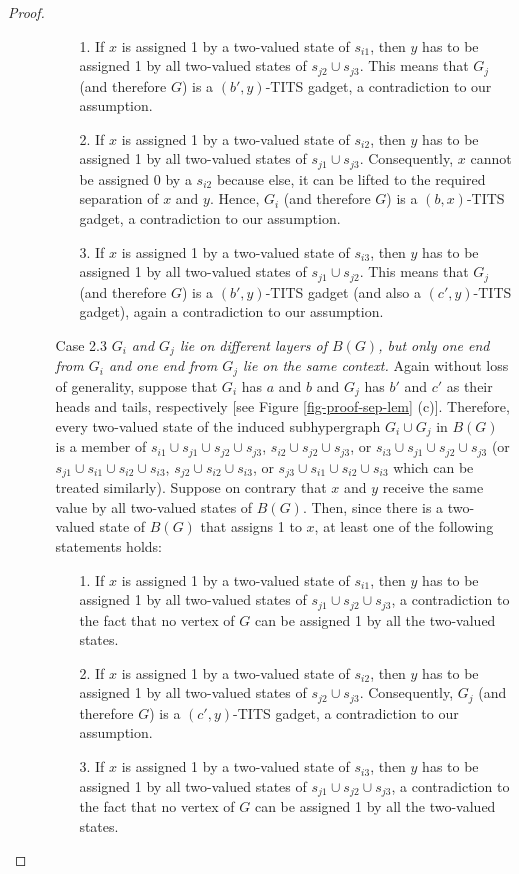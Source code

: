 \documentclass[%
12pt,
prereprint,
showpacs,
showkeys,
preprintnumbers,
amsmath,amssymb,
aps,
pra,
longbibliography,
notitlepage
]{revtex4-1}
\theoremstyle{definition}
\begin{document}
\begin{proof}
\begin{itemize}
\begin{itemize}
				\begin{itemize}
					\item[1.] If $x$ is assigned 1 by a two-valued state of $s_{i1}$, then $y$ has to be assigned 1 by all two-valued states of $s_{j2}\cup s_{j3}$. This means that $G_j$ (and therefore $G$) is a $(b',y)$-TITS gadget, a contradiction to our assumption.
					\item[2.] If $x$ is assigned 1 by a two-valued state of $s_{i2}$, then $y$ has to be assigned 1 by all two-valued states of $s_{j1}\cup s_{j3}$. Consequently, $x$ cannot be assigned 0 by a $s_{i2}$ because else, it can be lifted to the required separation of $x$ and $y$. Hence, $G_i$ (and therefore $G$) is a $(b,x)$-TITS gadget, a contradiction to our assumption.
					\item[3.] If $x$ is assigned 1 by a two-valued state of $s_{i3}$, then $y$ has to be assigned 1 by all two-valued states of $s_{j1}\cup s_{j2}$. This means that $G_j$ (and therefore $G$) is a $(b',y)$-TITS gadget (and also a $(c',y)$-TITS gadget), again a contradiction to our assumption.
				\end{itemize}
				\item[Case 2.3] \emph{$G_i$ and $G_j$ lie on different layers of $B(G)$, but only one end from $G_i$ and one end from $G_j$ lie on the same context.} Again without loss of generality, suppose that $G_i$ has $a$ and $b$ and $G_j$ has $b'$ and $c'$ as their heads and tails, respectively [see Figure \ref{fig-proof-sep-lem} (c)]. Therefore, every two-valued state of the induced subhypergraph $G_i \cup G_j$ in $B(G)$ is a member of $s_{i1} \cup s_{j1}\cup s_{j2}\cup s_{j3}$, $s_{i2} \cup s_{j2}\cup s_{j3}$, or $s_{i3}\cup s_{j1}\cup s_{j2} \cup s_{j3}$ (or $s_{j1} \cup s_{i1}\cup s_{i2}\cup s_{i3}$, $s_{j2} \cup s_{i2}\cup s_{i3}$, or $s_{j3}\cup s_{i1}\cup s_{i2} \cup s_{i3}$ which can be treated similarly). Suppose on contrary that $x$ and $y$ receive the same value by all two-valued states of $B(G)$. Then, since there is a two-valued state of $B(G)$ that assigns 1 to $x$, at least one of the following statements holds:
				
				\begin{itemize}
					\item[1.] If $x$ is assigned 1 by a two-valued state of $s_{i1}$, then $y$ has to be assigned 1 by all two-valued states of $s_{j1}\cup s_{j2}\cup s_{j3}$, a contradiction to the fact that no vertex of $G$ can be assigned 1 by all the two-valued states.
					\item[2.] If $x$ is assigned 1 by a two-valued state of $s_{i2}$, then $y$ has to be assigned 1 by all two-valued states of $s_{j2}\cup s_{j3}$. Consequently, $G_j$ (and therefore $G$) is a $(c',y)$-TITS gadget, a contradiction to our assumption.
					\item[3.] If $x$ is assigned 1 by a two-valued state of $s_{i3}$, then $y$ has to be assigned 1 by all two-valued states of $s_{j1}\cup s_{j2}\cup s_{j3}$, a contradiction to the fact that no vertex of $G$ can be assigned 1 by all the two-valued states.
				\end{itemize}
				

\end{itemize}
\end{itemize}
\end{proof}
\end{document}

